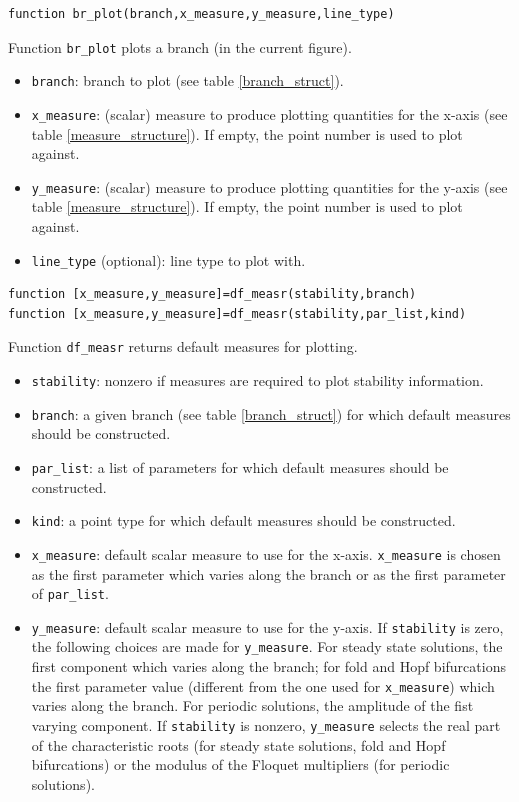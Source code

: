 \documentclass[10pt]{scrartcl}
\newcommand{\blist}[1]{\mbox{\lstinline!#1!}}
\begin{document}
{\begin{lstlisting}
function br_plot(branch,x_measure,y_measure,line_type)  
\end{lstlisting}
\noindent Function \blist{br_plot} plots a branch (in the current figure). 
\begin{itemize}
\item \blist{branch}: branch to plot (see table \ref{branch_struct}).
\item \blist{x_measure}: (scalar) measure to produce plotting quantities
for the x-axis (see table \ref{measure_structure}). 
If empty, the point number is used to plot against.
\item \blist{y_measure}: (scalar) measure to produce plotting quantities
for the y-axis (see table \ref{measure_structure}). 
If empty, the point number is used to plot against.
\item \blist{line_type} (optional): line type to plot with.
\end{itemize}

\begin{lstlisting}
function [x_measure,y_measure]=df_measr(stability,branch)
function [x_measure,y_measure]=df_measr(stability,par_list,kind)  
\end{lstlisting}
\noindent Function \blist{df_measr} returns default measures for
plotting.
\begin{itemize}
\item \blist{stability}: nonzero if measures are required to plot
  stability information.
\item \blist{branch}: a given branch (see table \ref{branch_struct})
  for which default measures should be constructed.
\item \blist{par_list}: a list of parameters for which default
  measures should be constructed.
\item \blist{kind}: a point type for which default measures should be
  constructed.
\item \blist{x_measure}: default scalar measure to use for the x-axis.
  \blist{x_measure} is chosen as the first parameter which varies
  along the branch or as the first parameter of \blist{par_list}.
\item \blist{y_measure}: default scalar measure to use for the y-axis.
  If \blist{stability} is zero, the following choices are made for
  \blist{y_measure}. For steady state solutions, the first component
  which varies along the branch; for fold and Hopf bifurcations the
  first parameter value (different from the one used for
  \blist{x_measure}) which varies along the branch. For periodic
  solutions, the amplitude of the fist varying component.  If
  \blist{stability} is nonzero, \blist{y_measure} selects the real
  part of the characteristic roots (for steady state solutions, fold
  and Hopf bifurcations) or the modulus of the Floquet multipliers
  (for periodic solutions).
\end{itemize}


}
\end{document}
